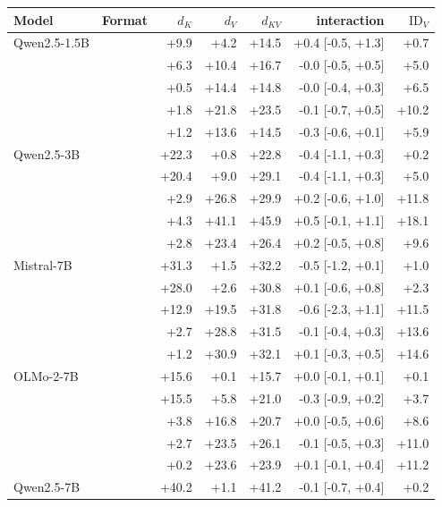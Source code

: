 \begin{tabular}{llrrrrr}
\toprule
Model & Format & $d_K$ & $d_V$ & $d_{KV}$ & interaction & $\mathrm{ID}_V$ \\
\midrule
Qwen2.5-1.5B & \fmtLetter{} & +9.9 & +4.2 & +14.5 & +0.4 \tiny[-0.5, +1.3] & +0.7 \\
 & \fmtOpt{} & +6.3 & +10.4 & +16.7 & -0.0 \tiny[-0.5, +0.5] & +5.0 \\
 & \fmtPost{} & +0.5 & +14.4 & +14.8 & -0.0 \tiny[-0.4, +0.3] & +6.5 \\
 & \fmtNone{} & +1.8 & +21.8 & +23.5 & -0.1 \tiny[-0.7, +0.5] & +10.2 \\
 & \fmtBefore{} & +1.2 & +13.6 & +14.5 & -0.3 \tiny[-0.6, +0.1] & +5.9 \\
\midrule
Qwen2.5-3B & \fmtLetter{} & +22.3 & +0.8 & +22.8 & -0.4 \tiny[-1.1, +0.3] & +0.2 \\
 & \fmtOpt{} & +20.4 & +9.0 & +29.1 & -0.4 \tiny[-1.1, +0.3] & +5.0 \\
 & \fmtPost{} & +2.9 & +26.8 & +29.9 & +0.2 \tiny[-0.6, +1.0] & +11.8 \\
 & \fmtNone{} & +4.3 & +41.1 & +45.9 & +0.5 \tiny[-0.1, +1.1] & +18.1 \\
 & \fmtBefore{} & +2.8 & +23.4 & +26.4 & +0.2 \tiny[-0.5, +0.8] & +9.6 \\
\midrule
Mistral-7B & \fmtLetter{} & +31.3 & +1.5 & +32.2 & -0.5 \tiny[-1.2, +0.1] & +1.0 \\
 & \fmtOpt{} & +28.0 & +2.6 & +30.8 & +0.1 \tiny[-0.6, +0.8] & +2.3 \\
 & \fmtPost{} & +12.9 & +19.5 & +31.8 & -0.6 \tiny[-2.3, +1.1] & +11.5 \\
 & \fmtNone{} & +2.7 & +28.8 & +31.5 & -0.1 \tiny[-0.4, +0.3] & +13.6 \\
 & \fmtBefore{} & +1.2 & +30.9 & +32.1 & +0.1 \tiny[-0.3, +0.5] & +14.6 \\
\midrule
OLMo-2-7B & \fmtLetter{} & +15.6 & +0.1 & +15.7 & +0.0 \tiny[-0.1, +0.1] & +0.1 \\
 & \fmtOpt{} & +15.5 & +5.8 & +21.0 & -0.3 \tiny[-0.9, +0.2] & +3.7 \\
 & \fmtPost{} & +3.8 & +16.8 & +20.7 & +0.0 \tiny[-0.5, +0.6] & +8.6 \\
 & \fmtNone{} & +2.7 & +23.5 & +26.1 & -0.1 \tiny[-0.5, +0.3] & +11.0 \\
 & \fmtBefore{} & +0.2 & +23.6 & +23.9 & +0.1 \tiny[-0.1, +0.4] & +11.2 \\
\midrule
Qwen2.5-7B & \fmtLetter{} & +40.2 & +1.1 & +41.2 & -0.1 \tiny[-0.7, +0.4] & +0.2 \\

\end{tabular}
